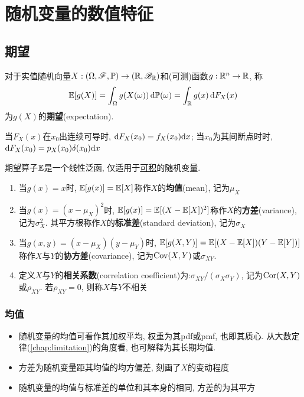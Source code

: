 \chapter{随机变量的数值特征}

\section{期望}

\begin{definition}
    对于实值随机向量$X : (\Omega,\mathscr{F},\mathbb{P}) \to (\mathbb{R},\mathscr{B}_{\mathbb{R}})$和(可测)函数$g : \mathbb{R}^n \to \mathbb{R}$, 称
    \[ \mathbb{E}[g(X)] = \int_{\Omega} g(X(\omega))\,\mathrm{d}\mathbb{P}(\omega) = \int_{\mathbb{R}} g(x) \,\mathrm{d} F_{X}(x) \]
    为$g(X)$的\textbf{期望}(expectation).
\end{definition}

\begin{remark}
    当$F_{X}(x)$在$x_0$出连续可导时, $\mathrm{d} F_{X}(x_0)=f_{X}(x_0)\mathrm{d} x$; 当$x_0$为其间断点时时, $\mathrm{d} F_{X}(x_0)=p_{X}(x_0)\delta(x_0)\mathrm{d} x$
\end{remark}

期望算子$\mathbb{E}$是一个线性泛函, 仅适用于\underline{可积}的随机变量.

\begin{definition}
    \begin{enumerate}
        \item 当$g(x)=x$时, $\mathbb{E}[g(x)]=\mathbb{E}[X]$称作$X$的\textbf{均值}(mean), 记为$\mu_{X}$
        \item 当$g(x)=(x-\mu_{X})^{2}$时, $\mathbb{E}[g(x)]=\mathbb{E}[(X-\mathbb{E}[X])^{2}]$称作$X$的\textbf{方差}(variance), 记为$\sigma^2_{X}$. 其平方根称作$X$的\textbf{标准差}(standard deviation), 记为$\sigma_{X}$
        \item 当$g(x,y)=(x-\mu_{X})(y-\mu_{Y})$时, $\mathbb{E}[g(X,Y)]=\mathbb{E}[(X-\mathbb{E}[X])(Y-\mathbb{E}[Y])]$称作$X$与$Y$的\textbf{协方差}(covariance), 记为$\operatorname{Cov}(X,Y)$或$\sigma_{XY}$.
        \item 定义$X$与$Y$的\textbf{相关系数}(correlation coefficient)为:$\sigma_{XY}/(\sigma_{X}\sigma_{Y})$, 记为$\operatorname{Cor}(X,Y)$或$\rho_{XY}$. 若$\rho_{XY}=0$, 则称$X$与$Y$不相关
    \end{enumerate}
\end{definition}

\subsection{均值}

\begin{remark}
    \begin{itemize}
        \item 随机变量的均值可看作其加权平均, 权重为其pdf或pmf, 也即其质心. 从大数定律(\ref{chap:limitation})的角度看, 也可解释为其长期均值.
        \item 方差为随机变量距其均值的均方偏差, 刻画了$X$的变动程度
        \item 随机变量的均值与标准差的单位和其本身的相同, 方差的为其平方
    \end{itemize}
\end{remark}

